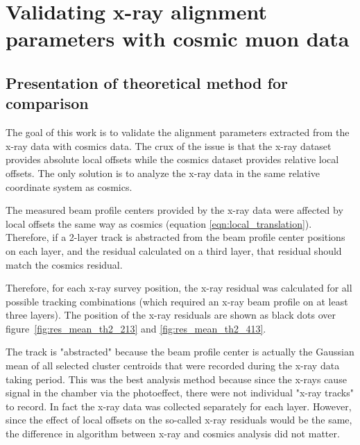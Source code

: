 
\chapter{Validating x-ray alignment parameters with cosmic muon data}
\label{chap:comparison}

\section{Presentation of theoretical method for comparison}

The goal of this work is to validate the alignment parameters extracted from the x-ray data with cosmics data. The crux of the issue is that the x-ray dataset provides absolute local offsets while the cosmics dataset provides relative local offsets. The only solution is to analyze the x-ray data in the same relative coordinate system as cosmics.

The measured beam profile centers provided by the x-ray data were affected by local offsets the same way as cosmics (equation \ref{eqn:local_translation}). Therefore, if a 2-layer track is abstracted from the beam profile center positions on each layer, and the residual calculated on a third layer, that residual should match the cosmics residual. 

Therefore, for each x-ray survey position, the x-ray residual was calculated for all possible tracking combinations (which required an x-ray beam profile on at least three layers). The position of the x-ray residuals are shown as black dots over figure~\ref{fig:res_mean_th2_213} and \ref{fig:res_mean_th2_413}.

The track is "abstracted" because the beam profile center is actually the Gaussian mean of all selected cluster centroids that were recorded during the x-ray data taking period. This was the best analysis method because since the x-rays cause signal in the chamber via the photoeffect, there were not individual "x-ray tracks" to record. In fact the x-ray data was collected separately for each layer. However, since the effect of local offsets on the so-called x-ray residuals would be the same, the difference in algorithm between x-ray and cosmics analysis did not matter. 

